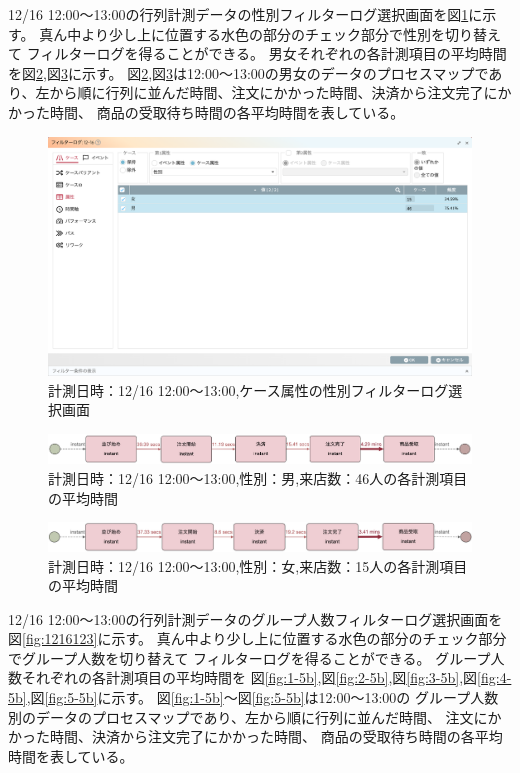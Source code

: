 \documentclass{jsarticle}
\begin{document}
12/16 12:00〜13:00の行列計測データの性別フィルターログ選択画面を図\ref{fig:1216mw}に示す。
真ん中より少し上に位置する水色の部分のチェック部分で性別を切り替えて
フィルターログを得ることができる。
男女それぞれの各計測項目の平均時間を図\ref{fig:man2},図\ref{fig:woman2}に示す。
図\ref{fig:man2},図\ref{fig:woman2}は12:00〜13:00の男女のデータのプロセスマップであり、左から順に行列に並んだ時間、注文にかかった時間、決済から注文完了にかかった時間、
商品の受取待ち時間の各平均時間を表している。

\begin{figure}[H]
  \centering
  \includegraphics[width=15cm]{1216mw.png}
  \caption{計測日時：12/16 12:00〜13:00,ケース属性の性別フィルターログ選択画面}
  \label{fig:1216mw}
\end{figure}

\begin{figure}[H]
  \centering
  \includegraphics[width=15cm]{man2.png}
  \caption{計測日時：12/16 12:00〜13:00,性別：男,来店数：46人の各計測項目の平均時間}
  \label{fig:man2}
\end{figure}
  
\begin{figure}[H]
  \centering
  \includegraphics[width=15cm]{woman2.png}
  \caption{計測日時：12/16 12:00〜13:00,性別：女,来店数：15人の各計測項目の平均時間}
  \label{fig:woman2}
\end{figure}


12/16 12:00〜13:00の行列計測データのグループ人数フィルターログ選択画面を図\ref{fig:1216123}に示す。
真ん中より少し上に位置する水色の部分のチェック部分でグループ人数を切り替えて
フィルターログを得ることができる。
グループ人数それぞれの各計測項目の平均時間を
図\ref{fig:1-5b},図\ref{fig:2-5b},図\ref{fig:3-5b},図\ref{fig:4-5b},図\ref{fig:5-5b}に示す。
図\ref{fig:1-5b}〜図\ref{fig:5-5b}は12:00〜13:00の
グループ人数別のデータのプロセスマップであり、左から順に行列に並んだ時間、
注文にかかった時間、決済から注文完了にかかった時間、
商品の受取待ち時間の各平均時間を表している。
\end{document}
